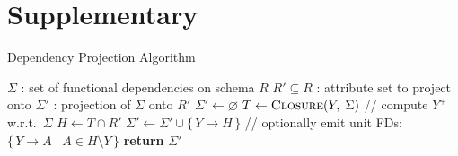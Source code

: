 \documentclass[UTF8]{beamer}
\begin{document}
\section{Supplementary}

\begin{frame}{Dependency Projection Algorithm}
\begin{algorithm}[H]
\scriptsize
\caption{Computing FD Projections (closure-based)}
\label{algorithm:algo}
\label{alg:fd-projection-closures}
\begin{algorithmic}[1]
\REQUIRE $\Sigma$ : set of functional dependencies on schema $R$
\REQUIRE $R' \subseteq R$ : attribute set to project onto
\ENSURE $\Sigma'$ : projection of $\Sigma$ onto $R'$
\STATE $\Sigma' \gets \varnothing$
    \STATE $T \gets \textsc{Closure}(Y,\; \Sigma)$ \hfill// compute $Y^+$ w.r.t.\ $\Sigma$
    \STATE $H \gets T \cap R'$
    \STATE $\Sigma' \gets \Sigma' \cup \{\, Y \to H \,\}$ \hfill// optionally emit unit FDs: $\{\,Y\to A \mid A \in H\setminus Y\,\}$
\ENDFOR
\STATE \textbf{return} $\Sigma'$
\end{algorithmic}
\end{algorithm}

\end{frame}
\end{document}
